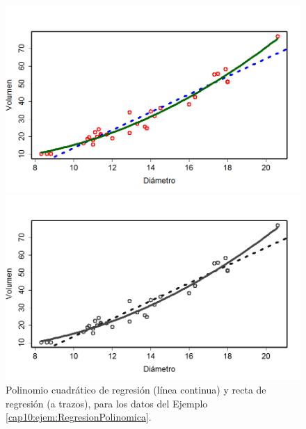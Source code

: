 \begin{ejemplo}
\begin{figure}[htbp]
\begin{center}
\begin{enColor}
\includegraphics[width=14cm]{../fig/Cap10-RegresionPolinomica02.png}
\end{enColor}
\begin{bn}
\includegraphics[width=14cm]{../fig/Cap10-RegresionPolinomica02-bn.png}
\end{bn}
\caption{Polinomio cuadrático de regresión (línea continua) y recta de regresión (a trazos), para los datos del Ejemplo \ref{cap10:ejem:RegresionPolinomica}.}
\label{cap10:fig:RegresionPolinomica02}
\end{center}
\end{figure}


\end{ejemplo}
